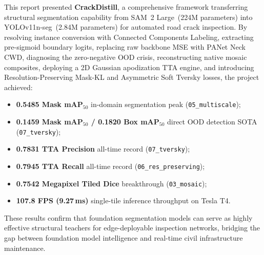 \documentclass[11pt,a4paper]{article}
\newcommand{\yolo}{YOLOv11n-seg}
\newcommand{\sam}{SAM~2 Large}
\begin{document}
This report presented \textbf{CrackDistill}, a comprehensive framework transferring structural segmentation capability from \sam\ (224M parameters) into \yolo\ (2.84M parameters) for automated road crack inspection. 
By resolving instance conversion with Connected Components Labeling, extracting pre-sigmoid boundary logits, replacing raw backbone MSE with PANet Neck CWD, diagnosing the zero-negative OOD crisis, reconstructing native mosaic composites, deploying a 2D Gaussian apodization TTA engine, and introducing Resolution-Preserving Mask-KL and Asymmetric Soft Tversky losses, the project achieved:
\begin{itemize}[leftmargin=1.5em]
  \item \textbf{0.5485 Mask mAP$_{50}$} in-domain segmentation peak (\texttt{05\_multiscale});
  \item \textbf{0.1459 Mask mAP$_{50}$ / 0.1820 Box mAP$_{50}$} direct OOD detection SOTA (\texttt{07\_tversky});
  \item \textbf{0.7831 TTA Precision} all-time record (\texttt{07\_tversky});
  \item \textbf{0.7945 TTA Recall} all-time record (\texttt{06\_res\_preserving});
  \item \textbf{0.7542 Megapixel Tiled Dice} breakthrough (\texttt{03\_mosaic});
  \item \textbf{107.8 FPS (9.27\,ms)} single-tile inference throughput on Tesla T4.
\end{itemize}
These results confirm that foundation segmentation models can serve as highly effective structural teachers for edge-deployable inspection networks, bridging the gap between foundation model intelligence and real-time civil infrastructure maintenance.
\end{document}
